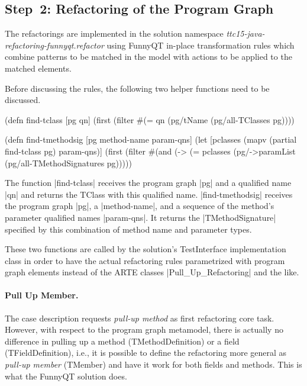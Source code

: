 \documentclass[submission]{eptcs}
\newcommand{\code}{\clojureinline}
\begin{document}
\subsection{Step~2: Refactoring of the Program Graph}
\label{sec:step-2:refactoring-pg}

The refactorings are implemented in the solution namespace
\emph{ttc15-java-refactoring-funnyqt.refactor} using FunnyQT in-place
transformation rules which combine patterns to be matched in the model with
actions to be applied to the matched elements.

Before discussing the rules, the following two helper functions need to be
discussed.

\begin{clojurecode}
(defn find-tclass [pg qn]
  (first (filter #(= qn (pg/tName %
                 (pg/all-TClasses pg))))

(defn find-tmethodsig [pg method-name param-qns]
  (let [pclasses (mapv (partial find-tclass pg) param-qns)]
    (first (filter #(and (-> %
                         (= pclasses (pg/->paramList %
                   (pg/all-TMethodSignatures pg)))))
\end{clojurecode}

The function \code|find-tclass| receives the program graph \code|pg| and a
qualified name \code|qn| and returns the \textsf{TClass} with this qualified
name.  \code|find-tmethodsig| receives the program graph \code|pg|, a
\code|method-name|, and a sequence of the method's parameter qualified names
\code|param-qns|.  It returns the \code|TMethodSignature| specified by this
combination of method name and parameter types.

These two functions are called by the solution's \textsf{TestInterface}
implementation class in order to have the actual refactoring rules parametrized
with program graph elements instead of the ARTE classes
\code|Pull_Up_Refactoring| and the like.


\paragraph{Pull Up Member.}

The case description requests \emph{pull-up method} as first refactoring core
task.  However, with respect to the program graph metamodel, there is actually
no difference in pulling up a method (\textsf{TMethodDefinition}) or a field
(\textsf{TFieldDefinition}), i.e., it is possible to define the refactoring
more general as \emph{pull-up member} (\textsf{TMember}) and have it work for
both fields and methods.  This is what the FunnyQT solution does.
\end{document}
